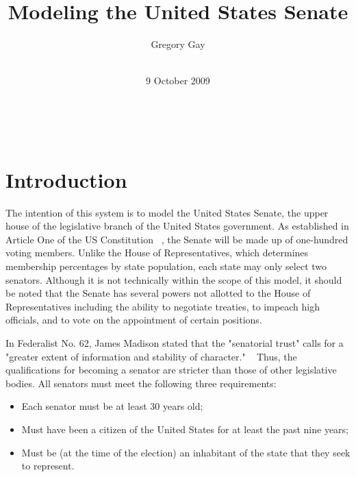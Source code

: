 \documentclass{sig-alternate}
\newcounter{over}
\newenvironment{smallitem}
 {\setlength{\topsep}{0pt}
  \setlength{\partopsep}{0pt}
  \setlength{\parskip}{0pt}
  \begin{itemize}
   \setlength{\leftmargin}{.2in}
  \setlength{\parsep}{0pt}
  \setlength{\parskip}{0pt}
  \setlength{\itemsep}{0pt}}
 {\end{itemize}}
\newcommand{\bi}{\begin{smallitem}}
\newcommand{\ei}{\end{smallitem}}
\begin{document}
\conferenceinfo{~} {~} 




\title{Modeling the United States Senate}

\author{
\alignauthor Gregory Gay
\\
       \\
}
%
\date{9 October 2009}

\maketitle
\begin{abstract}
\end{abstract}

\section{Introduction}

The intention of this system is to model the United States Senate, the upper house of the legislative branch of the United States government. As established in Article One of the US Constitution ~\cite{const}, the Senate will be made up of one-hundred voting members. Unlike the House of Representatives, which determines membership percentages by state population, each state may only select two senators. Although it is not technically within the scope of this model, it should be noted that the Senate has several powers not allotted to the House of Representatives including the ability to negotiate treaties, to impeach high officials, and to vote on the appointment of certain positions.

In Federalist No. 62, James Madison stated that the "senatorial trust" calls for a "greater extent of information and stability of character." ~\cite{mad62} Thus, the qualifications for becoming a senator are stricter than those of other legislative bodies. All senators must meet the following three requirements: 
\bi
\item Each senator must be at least 30 years old;
\item Must have been a citizen of the United States for at least the past nine years;
\item Must be (at the time of the election) an inhabitant of the state that they seek to represent. 
\ei
\end{document}
